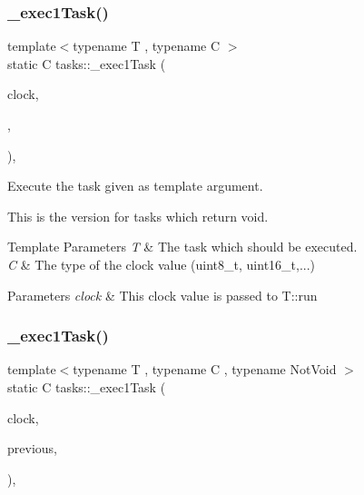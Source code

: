 \subsubsection{\texorpdfstring{\+\_\+exec1\+Task()}{\_exec1Task()}\hspace{0.1cm}{\footnotesize\ttfamily [1/2]}}
{\footnotesize\ttfamily template$<$typename T , typename C $>$ \\
static C tasks\+::\+\_\+exec1\+Task (\begin{DoxyParamCaption}\item[{C}]{clock,  }\item[{C}]{,  }\item[{void $\ast$}]{ }\end{DoxyParamCaption})\hspace{0.3cm}{\ttfamily [inline]}, {\ttfamily [static]}}



Execute the task given as template argument. 

This is the version for tasks which return void.


\begin{DoxyTemplParams}{Template Parameters}
{\em T} & The task which should be executed. \\
\hline
{\em C} & The type of the clock value (uint8\+\_\+t, uint16\+\_\+t,...) \\
\hline
\end{DoxyTemplParams}

\begin{DoxyParams}{Parameters}
{\em clock} & This clock value is passed to {\ttfamily T\+::run} \\
\hline
\end{DoxyParams}
\hypertarget{namespacetasks_ab00f443870b6da2320bc20560d04fd6a}{}\label{namespacetasks_ab00f443870b6da2320bc20560d04fd6a} 
\subsubsection{\texorpdfstring{\+\_\+exec1\+Task()}{\_exec1Task()}\hspace{0.1cm}{\footnotesize\ttfamily [2/2]}}
{\footnotesize\ttfamily template$<$typename T , typename C , typename Not\+Void $>$ \\
static C tasks\+::\+\_\+exec1\+Task (\begin{DoxyParamCaption}\item[{C}]{clock,  }\item[{C}]{previous,  }\item[{const Not\+Void $\ast$}]{ }\end{DoxyParamCaption})\hspace{0.3cm}{\ttfamily [inline]}, {\ttfamily [static]}}



